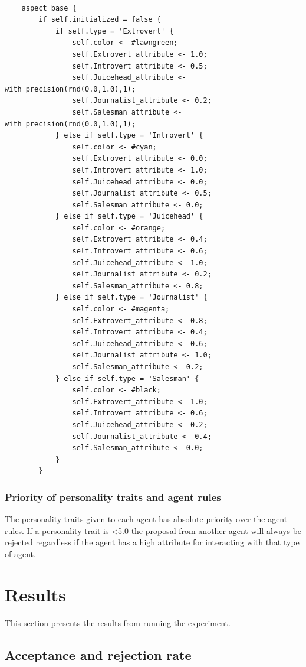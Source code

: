 \documentclass[a4paper,10pt]{article}
\begin{document}
\begin{verbatim}
    
	aspect base {
		if self.initialized = false {
			if self.type = 'Extrovert' {
				self.color <- #lawngreen;
				self.Extrovert_attribute <- 1.0;
				self.Introvert_attribute <- 0.5;
				self.Juicehead_attribute <- with_precision(rnd(0.0,1.0),1);
				self.Journalist_attribute <- 0.2;
				self.Salesman_attribute <- with_precision(rnd(0.0,1.0),1);
			} else if self.type = 'Introvert' {
				self.color <- #cyan;
				self.Extrovert_attribute <- 0.0;
				self.Introvert_attribute <- 1.0;
				self.Juicehead_attribute <- 0.0;
				self.Journalist_attribute <- 0.5;
				self.Salesman_attribute <- 0.0;
			} else if self.type = 'Juicehead' {
				self.color <- #orange;
				self.Extrovert_attribute <- 0.4;
				self.Introvert_attribute <- 0.6;
				self.Juicehead_attribute <- 1.0;
				self.Journalist_attribute <- 0.2;
				self.Salesman_attribute <- 0.8;
			} else if self.type = 'Journalist' {
				self.color <- #magenta;
				self.Extrovert_attribute <- 0.8;
				self.Introvert_attribute <- 0.4;
				self.Juicehead_attribute <- 0.6;
				self.Journalist_attribute <- 1.0;
				self.Salesman_attribute <- 0.2;
			} else if self.type = 'Salesman' {
				self.color <- #black;
				self.Extrovert_attribute <- 1.0;
				self.Introvert_attribute <- 0.6;
				self.Juicehead_attribute <- 0.2;
				self.Journalist_attribute <- 0.4;
				self.Salesman_attribute <- 0.0;
			}
		}
\end{verbatim}

\subsubsection{Priority of personality traits and agent rules}
The personality traits given to each agent has absolute priority over the agent rules. If a personality trait is \textless 5.0 the proposal from another agent will always be rejected regardless if the agent has a high attribute for interacting with that type of agent. 


\section{Results}

This section presents the results from running the experiment.

\subsection{Acceptance and rejection rate}
\end{document}
